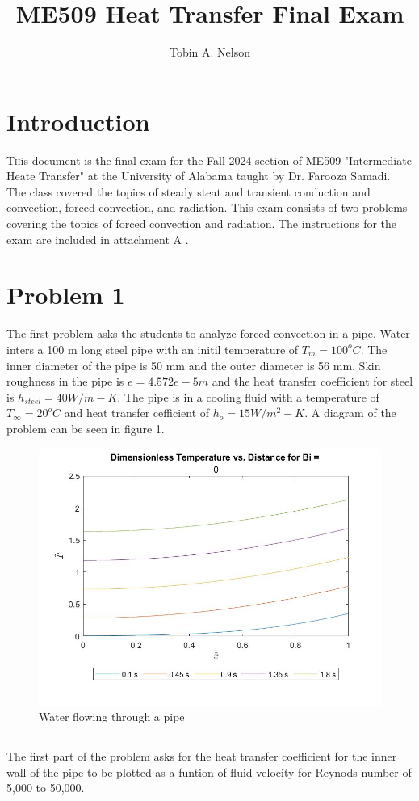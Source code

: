 \documentclass[conf]{new-aiaa}
\title{ME509 Heat Transfer Final Exam}
\author{Tobin A. Nelson}
\affil{University of Alabama, Tuscaloosa, AL, 35487}
\begin{document}
\maketitle


\section{Introduction}
\lettrine{T}his document is the final exam for the Fall 2024 section of ME509 "Intermediate Heate Transfer" at the University of Alabama taught by Dr. Farooza Samadi. The class covered the topics of steady steat and transient conduction and convection, forced convection, and radiation. This exam consists of two problems covering the topics of forced convection and radiation. The instructions for the exam are included in attachment A \cite{samadi}.



\section{Problem 1}
The first problem asks the students to analyze forced convection in a pipe. Water inters a 100 m long steel pipe with an initil temperature of $T_m=100^o C$. The inner diameter of the pipe is 50 mm and the outer diameter is 56 mm. Skin roughness in the pipe is $e=4.572e-5 m$ and the heat transfer coefficient for steel is $h_{steel}=40 W/m-K$. The pipe is in a cooling fluid with a temperature of $T_\infty = 20^o C$ and heat transfer cefficient of $h_o=15 W/m^2-K$. A diagram of the problem can be seen in figure 1.

\begin{figure}[hbt!]
\centering
\includegraphics[width=.5\textwidth]{Bi0.jpg}
\caption{Water flowing through a pipe}
\end{figure}

\subsection{}
The first part of the problem asks for the heat transfer coefficient for the inner wall of the pipe to be plotted as a funtion of fluid velocity for Reynods number of 5,000 to 50,000.
\end{document}
